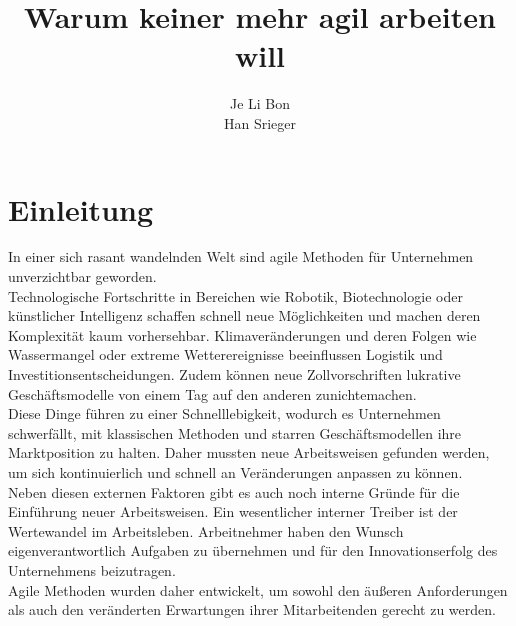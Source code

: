 \documentclass[ngerman]{seminarvorlage}
\begin{document}
\title{Warum keiner mehr agil arbeiten will}
\author{
  \alignauthor Je Li Bon \\
  \alignauthor Han Srieger\\
}

\maketitle%
\newpage

\abstract{
}


\section{Einleitung}

In einer sich rasant wandelnden Welt sind agile Methoden für Unternehmen unverzichtbar geworden.\\
Technologische Fortschritte in Bereichen wie Robotik, Biotechnologie oder künstlicher Intelligenz schaffen schnell neue Möglichkeiten und machen deren Komplexität kaum vorhersehbar. Klimaveränderungen und deren Folgen wie Wassermangel oder extreme Wetterereignisse beeinflussen Logistik und Investitionsentscheidungen. Zudem können neue Zollvorschriften lukrative Geschäftsmodelle von einem Tag auf den anderen zunichtemachen.\\
Diese Dinge führen zu einer Schnelllebigkeit, wodurch es Unternehmen schwerfällt, mit klassischen Methoden und starren Geschäftsmodellen ihre Marktposition zu halten. Daher mussten neue Arbeitsweisen gefunden werden, um sich kontinuierlich und schnell an Veränderungen anpassen zu können.\\
Neben diesen externen Faktoren gibt es auch noch interne Gründe für die Einführung neuer Arbeitsweisen.
Ein wesentlicher interner Treiber ist der Wertewandel im Arbeitsleben. Arbeitnehmer haben den Wunsch eigenverantwortlich Aufgaben zu übernehmen und für den Innovationserfolg des Unternehmens beizutragen.\\
 Agile Methoden wurden daher entwickelt, um sowohl den äußeren Anforderungen als auch den veränderten Erwartungen ihrer Mitarbeitenden gerecht zu werden.%
\end{document}
